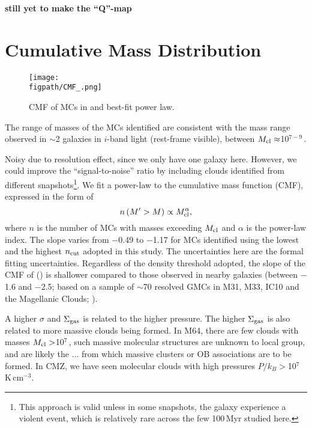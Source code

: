 \documentclass[iop]{emulateapj} %
\begin{document}
{\bf still yet to make the ``Q''-map}






\section{Cumulative Mass Distribution}   \label{sec:cmf}

\begin{figure*}[htbp]
\centering
\texttt{[image: \\figpath/CMF\_.png]}
\caption{
CMF of MCs in \flower and best-fit power law.
\label{fig:cmf}}
\end{figure*}

The range of masses of the MCs identified are consistent with the mass range observed in \z$\sim$2 galaxies in $i$-band light (rest-frame visible),
between $M_{\rm cl}\approx$10$^{7-9}$\,\Msun \citep{Elmegreen07a, Elmegreen09a}.

Noisy due to resolution effect, since we only have one galaxy here. However,
we could improve the ``signal-to-noise'' ratio by including clouds identified from different
snapshots\footnote{This approach is valid unless in some snapshots,
the galaxy experience a violent event, which is relatively rare across the few 100\,Myr studied here.}.
We fit a power-law to the cumulative mass function (CMF), expressed in the form of 
\begin{equation}
n\left(M^\prime > M\right) \propto M_{\rm cl}^\alpha,
\end{equation}
where $n$ is the number of MCs with masses exceeding $M_{\rm cl}$ and $\alpha$ is the power-law index.
The slope varies from $-$0.49 to $-$1.17 for MCs identified using the lowest and the
highest $n_{\rm cut}$ adopted in this study.
The uncertainties here are the formal fitting uncertainties.
Regardless of the density threshold adopted, the slope of the CMF of \flower ()
is shallower compared to those observed in nearby galaxies (between $-$1.6 and $-$2.5; based on a sample of
$\sim$70 resolved GMCs in M31, M33, IC10 and the Magellanic Clouds; \citealt{Blitz07a}). %

A higher $\sigma$ and $\Sigma_{\rm gas}$ is related to the higher
pressure. The higher $\Sigma_{\rm gas}$ is also related to more massive clouds being formed.
In M64, there are few clouds with masses $M_{\rm cl}>$10$^7$\,\Msun, such massive molecular
structures are unknown to local group, and are likely the ... from which massive clusters or OB associations are to be formed.
In CMZ, we have seen molecular clouds with high pressures $P/k_B > $10$^7$\,K\,cm$^{-3}$. %
\end{document}
